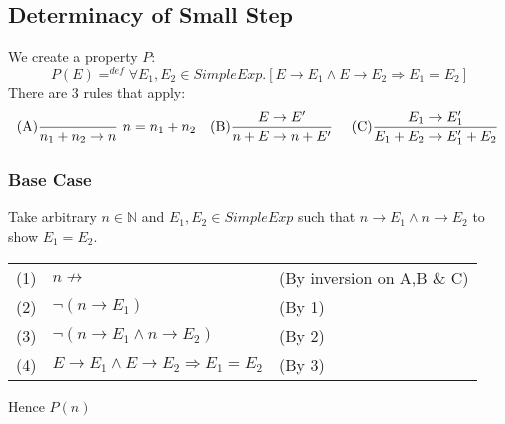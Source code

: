 \documentclass{report}
\begin{document}
        \subsection*{Determinacy of Small Step}
            We create a property $P$:
            \[P(E) =^{def} \forall E_1,E_2 \in SimpleExp .[E \to E_1 \land E \to E_2 \Rightarrow E_1 = E_2] \]
            There are 3 rules that apply:
            \[\begin{matrix}
                \text{(A)}\dfrac{}{n_1 + n_2 \to n} \ n = n_1 + n_2 & \text{(B)}\dfrac{E \to E'}{n + E \to n + E'} \  & \text{(C)}\dfrac{E_1 \to E_1'}{E_1 + E_2 \to E_1' + E_2} \ 
            \end{matrix}\]
            \subsubsection*{Base Case}
                Take arbitrary $n \in \mathbb{N}$ and $E_1,E_2 \in SimpleExp$ such that $n \to E_1 \land n \to E_2$ to show $E_1 = E_2$.
                \begin{center}
                    \begin{tabular}{l l l}
                        (1) & $n \not\to$ & (By inversion on A,B \& C) \\
                        (2) & $\neg (n \to E_1)$ & (By 1) \\
                        (3) & $\neg (n \to E_1 \land n \to E_2)$ & (By 2) \\
                        (4) & $E \to E_1 \land E \to E_2 \Rightarrow E_1 = E_2$ & (By 3) \\
                    \end{tabular}
                \end{center}
                Hence $P(n)$
\end{document}
